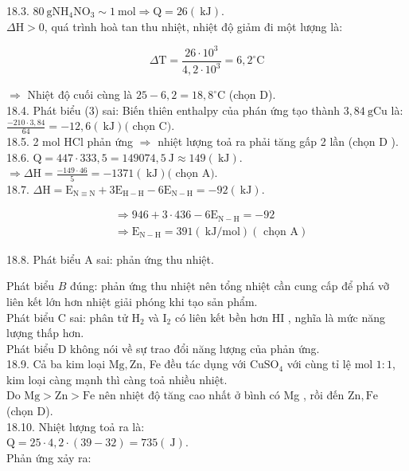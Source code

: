 \documentclass[10pt]{article}
\begin{document}
18.3. $80 \mathrm{~g} \mathrm{NH}_{4} \mathrm{NO}_{3} \sim 1 \mathrm{~mol} \Rightarrow \mathrm{Q}=26(\mathrm{~kJ})$.\\
$\Delta \mathrm{H}>0$, quá trình hoà tan thu nhiệt, nhiệt độ giảm đi một lượng là:

$$
\Delta \mathrm{T}=\frac{26 \cdot 10^{3}}{4,2 \cdot 10^{3}}=6,2^{\circ} \mathrm{C}
$$

$\Rightarrow$ Nhiệt độ cuối cùng là $25-6,2=18,8^{\circ} \mathrm{C}$ (chọn D).\\
18.4. Phát biểu (3) sai: Biến thiên enthalpy của phán ứng tạo thành $3,84 \mathrm{~g} \mathrm{Cu}$ là: $\frac{-210 \cdot 3,84}{64}=-12,6(\mathrm{~kJ})($ chọn C$)$.\\
18.5. 2 mol HCl phản ứng $\Rightarrow$ nhiệt lượng toả ra phải tăng gấp 2 lần (chọn D ).\\
18.6. $\mathrm{Q}=447 \cdot 333,5=149074,5 \mathrm{~J} \approx 149(\mathrm{~kJ})$.\\
$\Rightarrow \Delta \mathrm{H}=\frac{-149 \cdot 46}{5}=-1371(\mathrm{~kJ})($ chọn A$)$.\\
18.7. $\Delta \mathrm{H}=\mathrm{E}_{\mathrm{N} \equiv \mathrm{N}}+3 \mathrm{E}_{\mathrm{H}-\mathrm{H}}-6 \mathrm{E}_{\mathrm{N}-\mathrm{H}}=-92(\mathrm{~kJ})$.

$$
\begin{aligned}
& \Rightarrow 946+3 \cdot 436-6 \mathrm{E}_{\mathrm{N}-\mathrm{H}}=-92 \\
& \Rightarrow \mathrm{E}_{\mathrm{N}-\mathrm{H}}=391(\mathrm{~kJ} / \mathrm{mol})(\text { chọn } \mathrm{A})
\end{aligned}
$$

18.8. Phát biểu A sai: phản ứng thu nhiệt.

Phát biểu $B$ đúng: phản ứng thu nhiệt nên tổng nhiệt cần cung cấp để phá vỡ liên kết lớn hơn nhiệt giải phóng khi tạo sản phẩm.\\
Phát biểu C sai: phân tử $\mathrm{H}_{2}$ và $\mathrm{I}_{2}$ có liên kết bền hơn HI , nghĩa là mức năng lượng thấp hơn.\\
Phát biểu D không nói về sự trao đổi năng lượng của phản ứng.\\
18.9. Cả ba kim loại $\mathrm{Mg}, \mathrm{Zn}$, Fe đều tác dụng với $\mathrm{CuSO}_{4}$ với cùng tỉ lệ mol $1: 1$, kim loại càng mạnh thì càng toả nhiều nhiệt.\\
Do $\mathrm{Mg}>\mathrm{Zn}>\mathrm{Fe}$ nên nhiệt độ tăng cao nhất ở bình có Mg , rồi đến $\mathrm{Zn}, \mathrm{Fe}$ (chọn D).\\
18.10. Nhiệt lượng toả ra là:\\
$\mathrm{Q}=25 \cdot 4,2 \cdot(39-32)=735(\mathrm{~J})$.\\
Phản ứng xảy ra:
\end{document}
